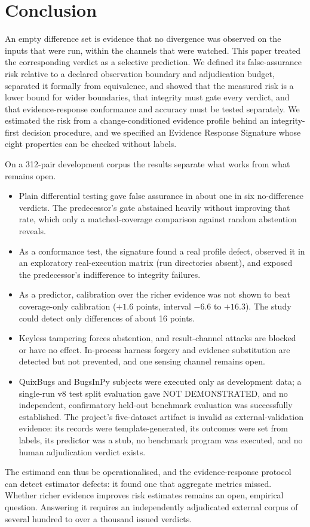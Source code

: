 \section{Conclusion}\label{sec:conclusion}

An empty difference set is evidence that no divergence was observed on the inputs that were run, within the channels that were watched. This paper treated the corresponding verdict as a selective prediction. We defined its false-assurance risk relative to a declared observation boundary and adjudication budget, separated it formally from equivalence, and showed that the measured risk is a lower bound for wider boundaries, that integrity must gate every verdict, and that evidence-response conformance and accuracy must be tested separately. We estimated the risk from a change-conditioned evidence profile behind an integrity-first decision procedure, and we specified an Evidence Response Signature whose eight properties can be checked without labels.

On a 312-pair development corpus the results separate what works from what remains open.
\begin{itemize}
\item Plain differential testing gave false assurance in about one in six no-difference verdicts. The predecessor's gate abstained heavily without improving that rate, which only a matched-coverage comparison against random abstention reveals.
\item As a conformance test, the signature found a real profile defect, observed it in an exploratory real-execution matrix (run directories absent), and exposed the predecessor's indifference to integrity failures.
\item As a predictor, calibration over the richer evidence was not shown to beat coverage-only calibration ($+1.6$ points, interval $-6.6$ to $+16.3$). The study could detect only differences of about 16 points.
\item Keyless tampering forces abstention, and result-channel attacks are blocked or have no effect. In-process harness forgery and evidence substitution are detected but not prevented, and one sensing channel remains open.
\item QuixBugs and BugsInPy subjects were executed only as development data; a single-run v8 test split evaluation gave NOT DEMONSTRATED, and no independent, confirmatory held-out benchmark evaluation was successfully established. The project's five-dataset artifact is invalid as external-validation evidence: its records were template-generated, its outcomes were set from labels, its predictor was a stub, no benchmark program was executed, and no human adjudication verdict exists.
\end{itemize}

The estimand can thus be operationalised, and the evidence-response protocol can detect estimator defects: it found one that aggregate metrics missed. Whether richer evidence improves risk estimates remains an open, empirical question. Answering it requires an independently adjudicated external corpus of several hundred to over a thousand issued verdicts.
